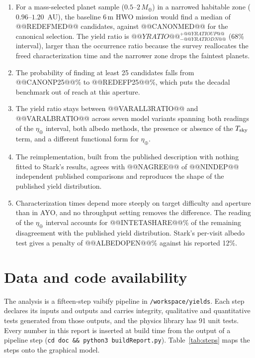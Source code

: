 \documentclass[11pt,a4paper]{article}
\begin{document}
\begin{enumerate}
\item For a mass-selected planet sample ($0.5$--$2\,M_\oplus$) in a narrowed habitable zone
($0.96$--$1.20$~AU), the baseline 6\,m HWO mission would find a median of @@REDEFMED@@ candidates,
against @@CANONMED@@ for the canonical selection. The yield ratio is
$@@YRATIO@@^{+@@YRATIOUP@@}_{-@@YRATIODN@@}$ (68\% interval), larger than the occurrence ratio because the survey
reallocates the freed characterization time and the narrower zone drops the faintest planets.
\item The probability of finding at least 25 candidates falls from @@CANONP25@@\% to
@@REDEFP25@@\%, which puts the decadal benchmark out of reach at this aperture.
\item The yield ratio stays between @@VARALL3RATIO@@ and @@VARALBRATIO@@ across seven model variants spanning both readings of
the $\eta_\oplus$ interval, both albedo methods, the presence or absence of the $T_{\rm sky}$ term,
and a different functional form for $\eta_\oplus$.
\item The reimplementation, built from the published description with nothing fitted to Stark's
results, agrees with @@NAGREE@@ of @@NINDEP@@ independent published comparisons and reproduces the
shape of the published yield distribution.
\item Characterization times depend more steeply on target difficulty and aperture than in AYO, and
no throughput setting removes the difference. The reading of the $\eta_\oplus$ interval accounts
for @@INTETASHARE@@\% of the remaining disagreement with the published yield distribution. Stark's
per-visit albedo test gives a penalty of @@ALBEDOPEN@@\% against his reported 12\%.
\end{enumerate}

\section*{Data and code availability}

The analysis is a fifteen-step vaibify pipeline in \texttt{/workspace/yields}. Each step declares
its inputs and outputs and carries integrity, qualitative and quantitative tests generated from
those outputs, and the physics library has 91 unit tests. Every number in this report is inserted
at build time from the output of a pipeline step (\texttt{cd doc \&\& python3 buildReport.py}).
Table~\ref{tab:steps} maps the steps onto the graphical model.
\end{document}
